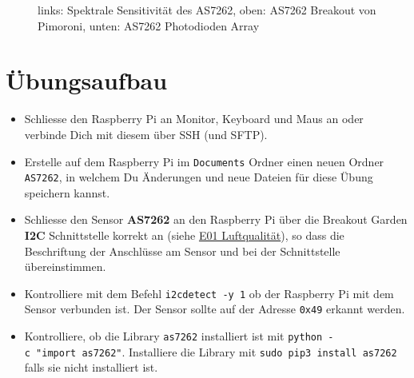\documentclass[
  11pt,
  a4paper,
  oneside, openany  ,captions=tableheading
]{scrbook}
\providecommand{\tightlist}{%
  \setlength{\itemsep}{0pt}\setlength{\parskip}{0pt}}
\theoremstyle{remark}
\renewcommand{\markright}[1]{\def\chaptertitle{#1}} %
\begin{document}
\begin{figure}


\caption{\label{fig-as7262}links: Spektrale Sensitivität des AS7262,
oben: AS7262 Breakout von Pimoroni, unten: AS7262 Photodioden Array}

\end{figure}%

\section*{Übungsaufbau}\label{uxfcbungsaufbau-1}

\markright{Übungsaufbau}

\begin{itemize}
\tightlist
\item
  Schliesse den Raspberry Pi an Monitor, Keyboard und Maus an oder
  verbinde Dich mit diesem über SSH (und SFTP).
\item
  Erstelle auf dem Raspberry Pi im \texttt{Documents} Ordner einen neuen
  Ordner \texttt{AS7262}, in welchem Du Änderungen und neue Dateien für
  diese Übung speichern kannst.
\item
  Schliesse den Sensor \textbf{AS7262} an den Raspberry Pi über die
  Breakout Garden \textbf{I2C} Schnittstelle korrekt an (siehe
  \href{E01_Luftqualitaet.qmd}{E01 Luftqualität}), so dass die
  Beschriftung der Anschlüsse am Sensor und bei der Schnittstelle
  übereinstimmen.
\item
  Kontrolliere mit dem Befehl \texttt{i2cdetect\ -y\ 1} ob der Raspberry
  Pi mit dem Sensor verbunden ist. Der Sensor sollte auf der Adresse
  \texttt{0x49} erkannt werden.
\item
  Kontrolliere, ob die Library \texttt{as7262} installiert ist mit
  \texttt{python\ -c\ "import\ as7262"}. Installiere die Library mit
  \texttt{sudo\ pip3\ install\ as7262} falls sie nicht installiert ist.
\end{itemize}
\end{document}
